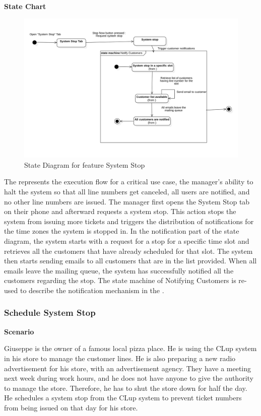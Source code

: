 \textbf{State Chart}

\begin{figure}[H]
    \centering
    \includegraphics[height=0.4\textwidth]{Images/StateCharts/SystemStop.png}
    \caption{State Diagram for feature System Stop}
    \label{fig:SDSystemStop}
\end{figure}

The  represents the execution flow for a critical use case, the manager's ability to halt the system so that all line numbers get canceled, all users are notified, and no other line numbers are issued.
The manager first opens the System Stop tab on their phone and afterward requests a system stop.
This action stops the system from issuing more tickets and triggers the distribution of notifications for the time zones the system is stopped in.
In the notification part of the state diagram, the system starts with a request for a stop for a specific time slot and retrieves all the customers that have already scheduled for that slot.
The system then starts sending emails to all customers that are in the list provided.
When all emails leave the mailing queue, the system has successfully notified all the customers regarding the stop.
The state machine of Notifying Customers is re-used to describe the notification mechanism in the .

\subsubsection{Schedule System Stop}

\textbf{Scenario}

Giuseppe is the owner of a famous local pizza place.
He is using the CLup system in his store to manage the customer lines.
He is also preparing a new radio advertisement for his store, with an advertisement agency.
They have a meeting next week during work hours, and he does not have anyone to give the authority to manage the store.
Therefore, he has to shut the store down for half the day.
He schedules a system stop from the CLup system to prevent ticket numbers from being issued on that day for his store.

